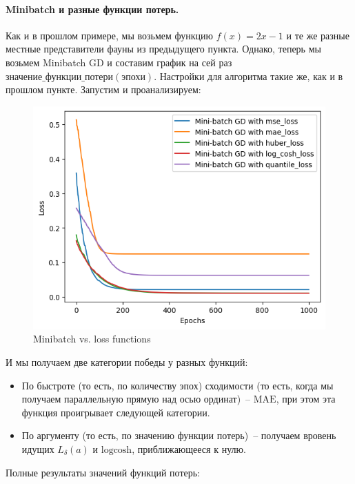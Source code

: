 \documentclass[12pt, a4paper, oneside, final]{article}
\begin{document}
	\paragraph{Minibatch и разные функции потерь.}
	Как и в прошлом примере, мы возьмем функцию $f(x) = 2x - 1$ и те же разные местные представители фауны из предыдущего пункта.
	Однако, теперь мы возьмем Minibatch GD и составим график на сей раз $\texttt{значение\_функции\_потери}(\texttt{эпохи})$.
	Настройки для алгоритма такие же, как и в прошлом пункте.
	Запустим и проанализируем:
	\begin{figure}[H]
		\centering
		\includegraphics[scale = 0.78]{Image/T1_MINIBATCH_with_LOSS_FUNCTIONS.png}
		\caption*{Minibatch vs. loss functions}
	\end{figure}
	И мы получаем две категории победы у разных функций:
	\begin{itemize}
		\item По быстроте (то есть, по количеству эпох) сходимости (то есть, когда мы получаем параллельную прямую над осью ординат)~-- $\text{MAE}$, при этом эта функция проигрывает следующей категории.
		\item По аргументу (то есть, по значению функции потерь)~-- получаем вровень идущих $L_{\delta}(a)$ и $\text{logcosh}$, приближающееся к нулю.
	\end{itemize}
	Полные результаты значений функций потерь:
\end{document}
